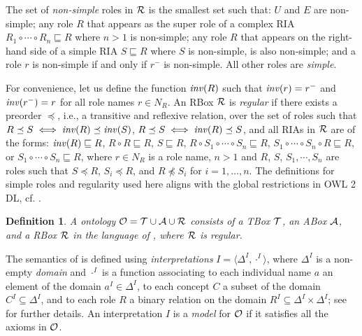 \documentclass[
]{ceurart}
\newtheorem{definition}{Definition}
\begin{document}
The set of \emph{non-simple} roles in $\mathcal{R}$ is the smallest set such that: $U$ and $E$ are non-simple; any role $R$ that appears as the super role of a complex RIA $R_1 \circ \cdots \circ R_n \sqsubseteq R$ where $n > 1$ is non-simple; any role $R$ that appears on the right-hand side of a simple RIA $S \sqsubseteq R$ where $S$ is non-simple, is also non-simple; and a role $r$ is non-simple if and only if $r^-$ is non-simple.
All other roles are \emph{simple}.

For convenience, let us define the function $\mathit{inv}(R)$ such that $\mathit{inv}(r) = r^-$ and $\mathit{inv}(r^-) = r$ for all role names $r \in N_R$. 
%
An RBox $\mathcal{R}$ is \emph{regular} if there exists a preorder $\preceq$, i.e., a transitive and reflexive relation, over the set of roles such that $R \preceq S \iff \mathit{inv}(R) \preceq \mathit{inv}(S)$, $R \preceq S \iff \mathit{inv}(R) \preceq S$, and all RIAs in $\mathcal{R}$ are of the forms:
$\mathit{inv}(R) \sqsubseteq R$,
$R \circ R \sqsubseteq R$,
$S \sqsubseteq R$, $R \circ S_1 \circ \cdots \circ S_n \sqsubseteq R$,
$S_1 \circ \cdots \circ S_n \circ R \sqsubseteq R$, or
$S_1 \circ \cdots \circ S_n \sqsubseteq R$,
where $r \in N_R$ is a role name, $n > 1$ and $R$, $S$, $S_1, \cdots, S_n$ are roles such that $S \preceq R$, $S_i \preceq R$, and $R \not\preceq S_i$ for $i = 1, \dots, n$. The definitions for simple roles and regularity used here aligns with the global restrictions in OWL 2 DL, cf. \cite{motik2012ontology}.

\begin{definition}
A \SROIQ  ontology $\mathcal{O} = \mathcal{T} \cup \mathcal{A} \cup \mathcal{R}$ consists of a TBox $\mathcal{T}$, an ABox $\mathcal{A}$, and a RBox $\mathcal{R}$ in the language of \SROIQ, where $\mathcal{R}$ is regular.    
\end{definition}


The semantics of \SROIQ is  defined using \emph{interpretations} $I = \langle \Delta^I, \cdot^I \rangle$, where $\Delta^I$ is a non-empty \emph{domain} and $\cdot^I$ is a function associating to each individual name $a$ an element of the domain $a^I \in \Delta^I$, to each concept $C$ a subset of the domain $C^I \subseteq \Delta^I$, and to each role $R$ a binary relation on the domain $R^I \subseteq \Delta^I \times \Delta^I$; see \cite{baader_horrocks_lutz_sattler_2017,HorrocksKutzSattlerKR2006} for further details. An interpretation $I$ is a \emph{model} for $\mathcal{O}$ if it satisfies all the axioms in $\mathcal{O}$.
\end{document}
